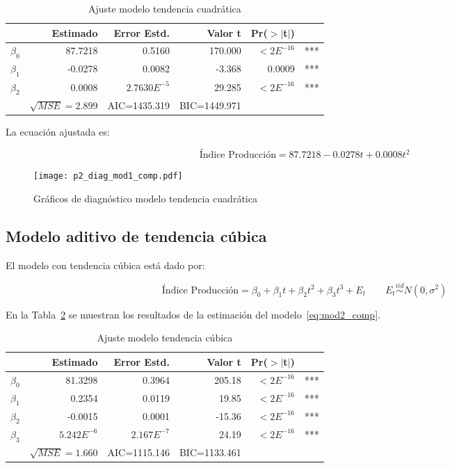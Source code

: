 \documentclass{tufte-handout}
\begin{document}
\begin{table}[ht]
\centering
\begin{tabular}{lrrrrl}
            & Estimado & Error Estd. & Valor t & Pr($>$$|$t$|$) & \\ 
  \hline
  $\beta_0$ & 87.7218 & 0.5160 & 170.000 & $< 2E^{-16}$ & *** \\ 
  $\beta_1$ & -0.0278 & 0.0082 & -3.368 & 0.0009 & *** \\ 
  $\beta_2$ & 0.0008 & $2.7630E^{-5}$ & 29.285 & $< 2E^{-16}$ & *** \\ 
   \hline
            & $\sqrt{MSE}=2.899$ & AIC=1435.319 & BIC=1449.971 & \\
   \hline
\end{tabular}
\caption{Ajuste modelo tendencia cuadrática} 
\label{tab:mod1_comp}
\end{table}

La ecuación ajustada es:

\begin{equation}
	\text{Índice Producción} = 87.7218 -0.0278 t + 0.0008 t^2
\end{equation}

\begin{figure*}[!ht]
    \texttt{[image: p2\_diag\_mod1\_comp.pdf]}
    \caption{Gráficos de diagnóstico modelo tendencia cuadrática}
    \label{fig:p2_diag_mod1_comp.pdf}
\end{figure*}

\subsection*{Modelo aditivo de tendencia cúbica}

El modelo con tendencia cúbica está dado por:

\begin{equation} \label{eq:mod2_comp}
	\text{Índice Producción} = \beta_0 + \beta_1 t + \beta_2 t^2 + \beta_3 t^3 + E_t
	\qquad E_t \stackrel{iid}{\sim} N(0, \sigma^2)
\end{equation}

En la Tabla~\ref{tab:mod2_comp} se muestran los resultados de la estimación del modelo~\ref{eq:mod2_comp}.

\begin{table}[ht]
\centering
\begin{tabular}{lrrrrl}
          & Estimado & Error Estd. & Valor t & Pr($>$$|$t$|$) & \\ 
  \hline
$\beta_0$ & 81.3298 & 0.3964 & 205.18 & $<2E^{-16}$ & *** \\ 
  $\beta_1$ & 0.2354 & 0.0119 & 19.85 & $<2E^{-16}$ & *** \\ 
  $\beta_2$ & -0.0015 & 0.0001 & -15.36 & $<2E^{-16}$ & *** \\ 
  $\beta_3$ & $5.242E^{-6}$ & $2.167E^{-7}$ & 24.19 & $<2E^{-16}$ & *** \\ 
   \hline
            & $\sqrt{MSE}=1.660$ & AIC=1115.146 & BIC=1133.461 & \\
   \hline
\end{tabular}
\caption{Ajuste modelo tendencia cúbica} 
\label{tab:mod2_comp}
\end{table}
\end{document}
